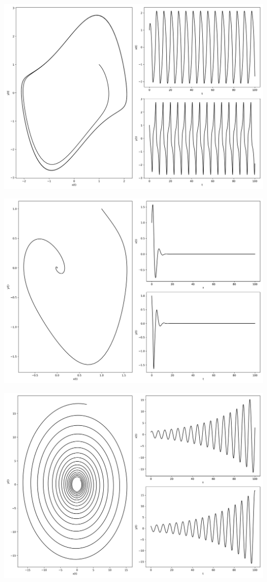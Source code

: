\documentclass[12pt,a4paper]{jsarticle}
\makeatletter
\def\figcaption{\def\@captype{figure}\caption}
\makeatother
\begin{document}
\figcaption{$x_0=3.00, y_0=3.00, \mu=1,00, \omega=1.00, T = 100, N = 1000$}
\includegraphics[scale=0.33]{x1,0y1,0mu1,0omega1,0t1,00e+02n2,00e+03.png}
\figcaption{$x_0=1,00, y_0=1.00, \mu=1.00, \omega=1.00, T = 100, N = 2000$}
\includegraphics[scale=0.33]{x1,0y1,0mu-1,0omega1,0t1,00e+02n2,00e+03.png}
\figcaption{$x_0=1,00, y_0=1.00, \mu=-1.00, \omega=1.00, T = 100, N = 2000$}
\includegraphics[scale=0.33]{x1,0y1,0mu0,0omega1,0t1,00e+02n2,00e+03.png}
\end{document}
